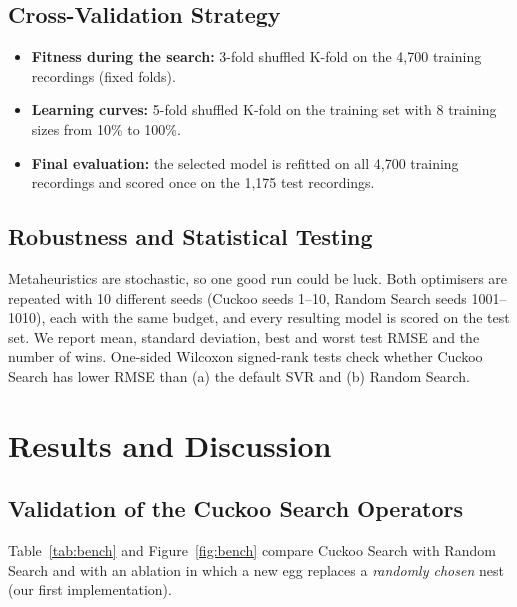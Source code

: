 \documentclass[12pt,a4paper]{article}
\numberwithin{equation}{section}
\numberwithin{table}{section}
\numberwithin{figure}{section}
\begin{document}
\subsection{Cross-Validation Strategy}
\begin{itemize}
  \item \textbf{Fitness during the search:} 3-fold shuffled K-fold on the 4,700 training recordings (fixed folds).
  \item \textbf{Learning curves:} 5-fold shuffled K-fold on the training set with 8 training sizes from 10\% to 100\%.
  \item \textbf{Final evaluation:} the selected model is refitted on all 4,700 training recordings and scored once on the 1,175 test recordings.
\end{itemize}

\subsection{Robustness and Statistical Testing}
Metaheuristics are stochastic, so one good run could be luck. Both optimisers are repeated with 10 different seeds (Cuckoo seeds 1--10, Random Search seeds 1001--1010), each with the same budget, and every resulting model is scored on the test set. We report mean, standard deviation, best and worst test RMSE and the number of wins. One-sided Wilcoxon signed-rank tests check whether Cuckoo Search has lower RMSE than (a) the default SVR and (b) Random Search.

\section{Results and Discussion}\label{sec:results}

\subsection{Validation of the Cuckoo Search Operators}\label{sec:bench}
Table~\ref{tab:bench} and Figure~\ref{fig:bench} compare Cuckoo Search with Random Search and with an ablation in which a new egg replaces a \emph{randomly chosen} nest (our first implementation).
\end{document}
